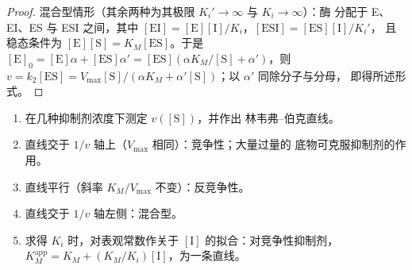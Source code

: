 \begin{proof}
混合型情形（其余两种为其极限 $K_i' \to \infty$ 与 $K_i \to \infty$）：酶
分配于 E、EI、ES 与 ESI 之间，其中 $[\mathrm{EI}] = [\mathrm E][\mathrm I]/K_i$，$[\mathrm{ESI}] = [\mathrm{ES}][\mathrm I]/K_i'$，
且稳态条件为 $[\mathrm E][\mathrm S] = K_M[\mathrm{ES}]$。于是 $[\mathrm E]_0 = [\mathrm E]\alpha + [\mathrm{ES}]\alpha' =
[\mathrm{ES}](\alpha K_M/[\mathrm S] + \alpha')$，则 $v = k_2[\mathrm{ES}] = V_{\max}[\mathrm S]/(\alpha K_M + \alpha'[\mathrm S])$；以 $\alpha'$ 同除分子与分母，
即得所述形式。
\end{proof}

\begin{method}[判别抑制的类型]\label{met:b3:complex-kinetics:inhibition-type}
\begin{enumerate}
  \item 在几种抑制剂浓度下测定 $v([\mathrm S])$，并作出
        林韦弗–伯克直线。
  \item 直线交于 $1/v$ 轴上（$V_{\max}$ 相同）：竞争性；大量过量的
        底物可克服抑制剂的作用。
  \item 直线平行（斜率 $K_M/V_{\max}$ 不变）：反竞争性。
  \item 直线交于 $1/v$ 轴左侧：混合型。
  \item 求得 $K_i$ 时，对表观常数作关于 $[\mathrm I]$ 的拟合：对竞争性抑制剂，
        $K_M^{\mathrm{app}} = K_M + (K_M/K_i)[\mathrm I]$，为一条直线。
\end{enumerate}
\end{method}

